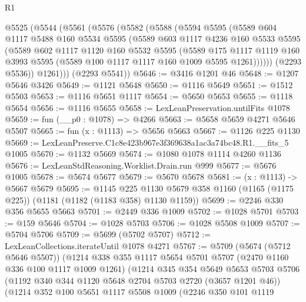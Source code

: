 \begin{lexlean}{R1}
\begin{coremodule}
  @5525
    (@5544
      (@5561
        (@5576
          (@5582
            (@5588
              (@5594
                @5595
                (@5589
                  @604
                  @1117
                  @5488
                  @160
                  @5534
                  @5595
                  (@5589
                    @603
                    @1117
                    @4236
                    @160
                    @5533
                    @5595
                    (@5589
                      @602
                      @1117
                      @1120
                      @160
                      @5532
                      @5595
                      (@5589
                        @175
                        @1117
                        @1119
                        @160
                        @3993
                        @5595
                        (@5589 @100 @1117 @1117 @160 @1009 @5595 @1261))))))
              (@2293 @5536))
            @1261)))
      (@2293 @5541))
@5646 := @3416 @1201 @46
@5648 := @1207 @5646 @3426
@5649 := @1121 @5648
@5650 := @1116 @5649
@5651 := @1512 @5503
@5653 := @1116 @5651 @1117
@5654 := @5650 @5653
@5655 := @1118 @5654
@5656 := @1116 @5655
@5658 := LexLeanPreservation.untilFits @1078
@5659 := fun (__p0 : @1078) => @4266
@5663 := @5658 @5659 @4271 @5646 @5507
@5665 := fun (x : @1113) => @5656 @5663
@5667 := @1126 @225 @1130
@5669 := LexLeanPreserve.C1c8e423b967e3f369638a1ac3a74bc48.R1.__fits_5 @1005
@5670 := @1132 @5669
@5674 := @1080 @1078 @1114 @4260 @1136
@5676 := LexLeanStdReasoning.Worklist.Drain.run @999
@5677 := @5676 @1005
@5678 := @5674 @5677
@5679 := @5670 @5678
@5681 := (x : @1113) -> @5667 @5679
@5695 := @1145
    @225
    @1130
    @5679
    @358
    @1160
    (@1165 (@1175 @225))
    (@1181 (@1182 (@1183 @358) @1130 @1159))
@5699 := @2246 @330 @356 @5655 @5663
@5701 := @2449 @336 @1009
@5702 := @1028 @5701
@5703 := @159 @5646
@5704 := @1028 @5703
@5706 := @1028 @5508 @1009
@5707 := @5704 @5706
@5709 := @5699 (@5702 @5707)
@5712 := LexLeanCollections.iterateUntil @1078 @4271
@5767 := @5709
    (@5674 (@5712 @5646 @5507))
    (@1214
      @338
      @355
      @1117
      @5654
      @5701
      @5707
      (@2470 @1160 @336 @100 @1117 @1009 @1261)
      (@1214
        @345
        @354
        @5649
        @5653
        @5703
        @5706
        (@1192 @340 @344 @1120 @5648 @2704 @5703 @2720 (@3657 @1201 @46))
        (@1214
          @352
          @100
          @5651
          @1117
          @5508
          @1009
          (@2246
            @350
            @101
            @1119

\end{coremodule}
\end{lexlean}
